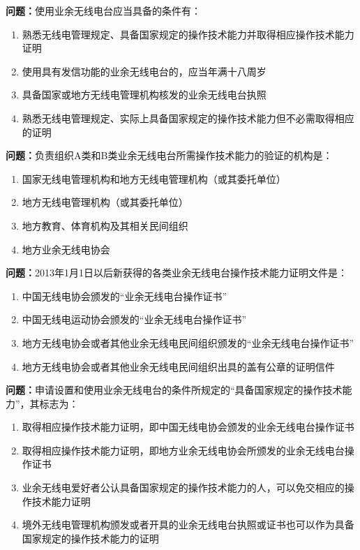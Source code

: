 \documentclass[UTF8]{ctexbook}
\begin{document}
\textbf{问题：}使用业余无线电台应当具备的条件有：
\begin{enumerate}[label=\Alph*), leftmargin=3em]
  \item 熟悉无线电管理规定、具备国家规定的操作技术能力并取得相应操作技术能力证明
  \item 使用具有发信功能的业余无线电台的，应当年满十八周岁
  \item 具备国家或地方无线电管理机构核发的业余无线电台执照
  \item 熟悉无线电管理规定、实际上具备国家规定的操作技术能力但不必需取得相应的证明
\end{enumerate}

\textbf{问题：}负责组织A类和B类业余无线电台所需操作技术能力的验证的机构是：
\begin{enumerate}[label=\Alph*), leftmargin=3em]
  \item 国家无线电管理机构和地方无线电管理机构（或其委托单位）
  \item 地方无线电管理机构（或其委托单位）
  \item 地方教育、体育机构及其相关民间组织
  \item 地方业余无线电协会
\end{enumerate}

\textbf{问题：}2013年1月1日以后新获得的各类业余无线电台操作技术能力证明文件是：
\begin{enumerate}[label=\Alph*), leftmargin=3em]
  \item 中国无线电协会颁发的“业余无线电台操作证书”
  \item 中国无线电运动协会颁发的“业余无线电台操作证书”
  \item 地方无线电协会或者其他业余无线电民间组织颁发的“业余无线电台操作证书”
  \item 地方无线电协会或者其他业余无线电民间组织出具的盖有公章的证明信件
\end{enumerate}

\textbf{问题：}申请设置和使用业余无线电台的条件所规定的“具备国家规定的操作技术能力”，其标志为：
\begin{enumerate}[label=\Alph*), leftmargin=3em]
  \item 取得相应操作技术能力证明，即中国无线电协会颁发的业余无线电台操作证书
  \item 取得相应操作技术能力证明，即地方业余无线电协会所颁发的业余无线电台操作证书
  \item 业余无线电爱好者公认具备国家规定的操作技术能力的人，可以免交相应的操作技术能力证明
  \item 境外无线电管理机构颁发或者开具的业余无线电台执照或证书也可以作为具备国家规定的操作技术能力的证明
\end{enumerate}
\end{document}
